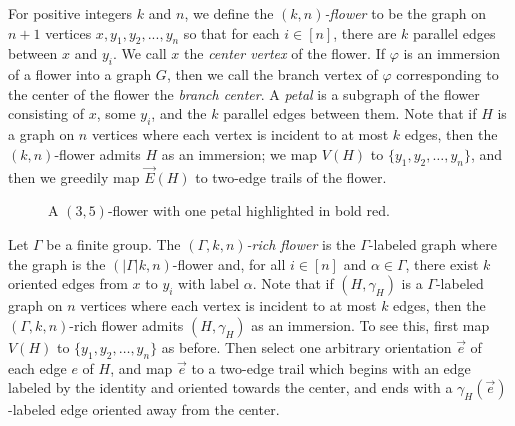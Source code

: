\documentclass[11pt]{article}
\theoremstyle{definition}
\begin{document}
For positive integers $k$ and $n$, we define the \textit{$(k,n)$-flower} to be the graph on $n+1$ vertices $x, y_1, y_2, ..., y_n$ so that for each $i \in [n]$, there are $k$ parallel edges between $x$ and $y_i$. We call $x$ the \textit{center vertex} of the flower. If $\varphi$ is an immersion of a flower into a graph $G$, then we call the branch vertex of $\varphi$ corresponding to the center of the flower the \emph{branch center}. A \emph{petal} is a subgraph of the flower consisting of $x$, some $y_i$, and the $k$ parallel edges between them. Note that if $H$ is a graph on $n$ vertices where each vertex is incident to at most $k$ edges, then the $(k,n)$-flower admits $H$ as an immersion; we map $V(H)$ to $\{y_1,y_2, \ldots, y_n\}$, and then we greedily map $\vec{E}(H)$ to two-edge trails of the flower.

\begin{figure}
\centering
{}
\caption{A $(3,5)$-flower with one petal highlighted in bold red.}
\label{fig:FlowerPetal}
\end{figure}

Let $\Gamma$ be a finite group. The \textit{$(\Gamma, k, n)$-rich flower} is the $\Gamma$-labeled graph where the graph is the $(|\Gamma|k, n)$-flower and, for all $i \in [n]$ and $\alpha \in \Gamma$, there exist $k$ oriented edges from $x$ to $y_i$ with label $\alpha$. Note that if $(H, \gamma_H)$ is a $\Gamma$-labeled graph on $n$ vertices where each vertex is incident to at most $k$ edges, then the $(\Gamma, k, n)$-rich flower admits $(H, \gamma_H)$ as an immersion. To see this, first map $V(H)$ to $\{y_1, y_2, \ldots, y_n\}$ as before. Then select one arbitrary orientation $\vec{e}$ of each edge $e$ of $H$, and map $\vec{e}$ to a two-edge trail which begins with an edge labeled by the identity and oriented towards the center, and ends with a $\gamma_H(\vec{e})$-labeled edge oriented away from the center.
\end{document}
